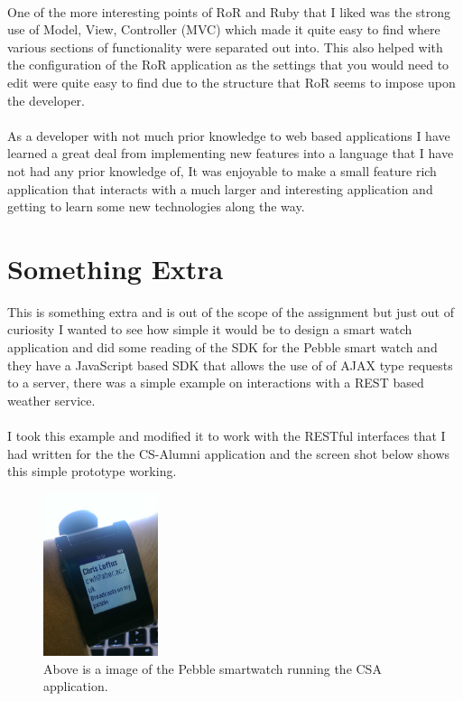 \documentclass{article}
\begin{document}
\\
One of the more interesting points of RoR and Ruby that I liked was the strong use of Model, View, Controller (MVC) which made it quite easy to find where various sections of functionality were separated out into. This also helped with the configuration of the RoR application as the settings that you would need to edit were quite easy to find due to the structure that RoR seems to impose upon the developer.\\
\\
As a developer with not much prior knowledge to web based applications I have learned a great deal from implementing new features into a language that I have not had any prior knowledge of, It was enjoyable to make a small feature rich application that interacts with a much larger and interesting application and getting to learn some new technologies along the way.

\newpage
\section{Something Extra}

This is something extra and is out of the scope of the assignment but just out of curiosity I wanted to see how simple it would be to design a smart watch application and did some reading of the SDK for the Pebble smart watch and they have a JavaScript based SDK that allows the use of of AJAX type requests to a server, there was a simple example on interactions with a REST based weather service.\\
\\
I took this example and modified it to work with the RESTful interfaces that I had written for the the CS-Alumni application and the screen shot below shows this simple prototype working.

\begin{figure}[H]
\centering
\includegraphics[width=0.3\textwidth]{pebble}
\caption{Above is a image of the Pebble smartwatch running the CSA application.}
\end{figure}
\end{document}
